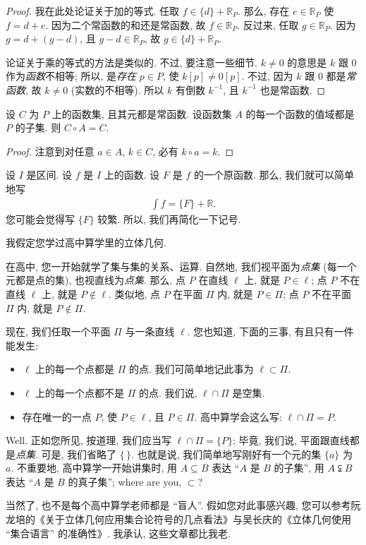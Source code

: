 \begin{proof}
    我在此处论证关于加的等式. 任取 $f \in \{ d \} + \mathbb{R}_{P}$. 那么, 存在 $e \in \mathbb{R}_{P}$ 使 $f = d + e$. 因为二个常函数的和还是常函数, 故 $f \in \mathbb{R}_{P}$. 反过来, 任取 $g \in \mathbb{R}_{P}$. 因为 $g = d + (g - d)$, 且 $g - d \in \mathbb{R}_{P}$, 故 $g \in \{ d \} + \mathbb{R}_{P}$.

    论证关于乘的等式的方法是类似的. 不过, 要注意一些细节. $k \neq 0$ 的意思是 $k$ 跟 $0$ 作为\emph{函数}不相等; 所以, 是\emph{存在} $p \in P$, 使 $k[p] \neq 0[p]$. 不过, 因为 $k$ 跟 $0$ 都是\emph{常函数}, 故 $k \neq 0$ (实数的不相等). 所以 $k$ 有倒数 $k^{-1}$, 且 $k^{-1}$ 也是常函数.
\end{proof}

\begin{theorem}
    设 $C$ 为 $P$ 上的函数集, 且其元都是常函数. 设函数集 $A$ 的每一个函数的值域都是 $P$ 的子集. 则 $C \circ A = C$.
\end{theorem}

\begin{proof}
    注意到对任意 $a \in A$, $k \in C$, 必有 $k \circ a = k$.
\end{proof}

设 $I$ 是区间. 设 $f$ 是 $I$ 上的函数. 设 $F$ 是 $f$ 的一个原函数. 那么, 我们就可以简单地写
\begin{align*}
    \int {f} = \{ F \} + \mathbb{R}.
\end{align*}
您可能会觉得写 $\{ F \}$ 较繁. 所以, 我们再简化一下记号.

\begin{example}
    我假定您学过高中算学里的立体几何.

    在高中, 您一开始就学了集与集的关系、运算. 自然地, 我们视平面为\emph{点集} (每一个元都是点的集), 也视直线为\emph{点集}. 那么, 点 $P$ 在直线 $\ell$ 上, 就是 $P \in \ell$; 点 $P$ 不在直线 $\ell$ 上, 就是 $P \notin \ell$. 类似地, 点 $P$ 在平面 $\Pi$ 内, 就是 $P \in \Pi$; 点 $P$ 不在平面 $\Pi$ 内, 就是 $P \notin \Pi$.

    现在, 我们任取一个平面 $\Pi$ 与一条直线 $\ell$. 您也知道, 下面的三事, 有且只有一件能发生:
    \begin{itemize}
        \item $\ell$ 上的每一个点都是 $\Pi$ 的点. 我们可简单地记此事为 $\ell \subset \Pi$.
        \item $\ell$ 上的每一个点都不是 $\Pi$ 的点. 我们说, $\ell \cap \Pi$ 是空集.
        \item 存在唯一的一点 $P$, 使 $P \in \ell$, 且 $P \in \Pi$. 高中算学会这么写: $\ell \cap \Pi = P$.
    \end{itemize}
    Well. 正如您所见, 按道理, 我们应当写 $\ell \cap \Pi = \{ P \}$; 毕竟, 我们说, 平面跟直线都是\emph{点集}. 可是, 我们省略了 $\{ \, \}$. 也就是说, 我们简单地写刚好有一个元的集 $\{ a \}$ 为 $a$. 不重要地, 高中算学一开始讲集时, 用 $A \subseteq B$ 表达 ``$A$ 是 $B$ 的子集'', 用 $A \subsetneqq B$ 表达 ``$A$ 是 $B$ 的真子集''; where are you, $\subset$?

    当然了, 也不是每个高中算学老师都是 ``盲人''. 假如您对此事感兴趣, 您可以参考阮龙培的《关于立体几何应用集合论符号的几点看法》与吴长庆的《立体几何使用 ``集合语言'' 的准确性》. 我承认, 这些文章都比我老.
\end{example}

